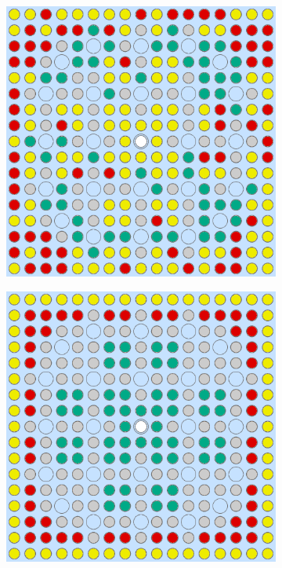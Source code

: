 \begin{appendices}
\begin{figure}[h!]
\begin{subfigure}{0.48\textwidth}
  \caption{}
  \label{fig:no-features-assm-16-combined-2}
\end{subfigure}
\begin{subfigure}{0.48\textwidth}
  \centering
  \includegraphics[width=0.85\linewidth]{figures/unsupervised/geometries/without-features/4-clusters/pinch/assm-16}
  \caption{}
  \label{fig:no-features-assm-16-pinch-4}
\end{subfigure}%
\begin{subfigure}{0.48\textwidth}
  \centering
  \includegraphics[width=0.85\linewidth]{figures/unsupervised/geometries/without-features/4-clusters/combined/assm-16}

\end{subfigure}
\end{figure}
\end{appendices}
